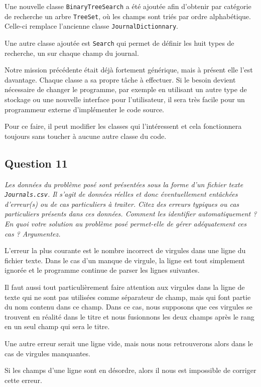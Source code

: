\documentclass[11pt]{article}
\begin{document}
Une nouvelle classe \verb+BinaryTreeSearch+ a été ajoutée afin d'obtenir par catégorie de recherche un arbre \verb+TreeSet+, où les champs sont triés par ordre alphabétique. Celle-ci remplace l'ancienne classe \verb+JournalDictionnary+.

Une autre classe ajoutée est \verb+Search+ qui permet de définir les huit types de recherche, un sur chaque champ du journal.

Notre mission précédente était déjà fortement générique, mais à présent elle l'est davantage. Chaque classe a sa propre tâche à effectuer. Si le besoin devient nécessaire de changer le programme, par exemple en utilisant un autre type de stockage ou une nouvelle interface pour l'utilisateur, il sera très facile pour un programmeur externe d'implémenter le code source.

Pour ce faire, il peut modifier les classes qui l'intéressent et cela fonctionnera toujours sans toucher à aucune autre classe du code.

\subsection*{Question 11}
\textit{Les données du problème posé sont présentées sous la forme d’un fichier texte \texttt{Journals.csv}. Il s’agit de données réelles et donc éventuellement entâchées d’erreur(s) ou de cas particuliers à traiter. Citez des erreurs typiques ou cas particuliers présents dans ces données. Comment les identifier automatiquement ? En quoi votre solution au problème posé permet-elle de gérer adéquatement ces cas ? Argumentez.} \\ \medskip


L'erreur la plus courante est le nombre incorrect de virgules dans une ligne du fichier texte. Dans le cas d'un manque de virgule, la ligne est tout simplement ignorée et le programme continue de parser les lignes suivantes.

Il faut aussi tout particulièrement faire attention aux virgules dans la ligne de texte qui ne sont pas utilisées comme séparateur de champ, mais qui font partie du nom contenu dans ce champ.
Dans ce cas, nous supposons que ces virgules se trouvent en réalité dans le titre et nous fusionnons les deux champs après le rang en un seul champ qui sera le titre.

Une autre erreur serait une ligne vide, mais nous nous retrouverons alors dans le cas de virgules manquantes.

Si les champs d'une ligne sont en désordre, alors il nous est impossible de corriger cette erreur.
\end{document}
